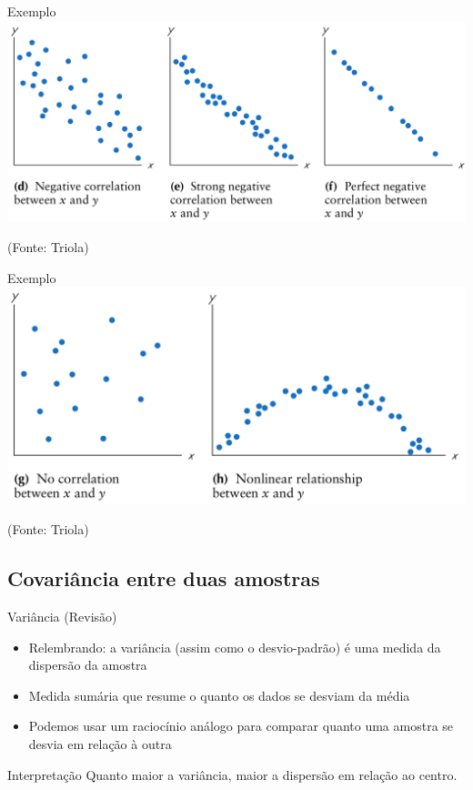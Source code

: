 \documentclass{beamer}
\begin{document}
\begin{frame}{Exemplo}
  \includegraphics[height=0.6\textheight]{Assoc/negative}

  (Fonte: Triola)
\end{frame}

\begin{frame}{Exemplo}
  \includegraphics[height=0.6\textheight]{Assoc/other}

  (Fonte: Triola)
\end{frame}

\subsection[Covariância]{Covariância entre duas amostras}

\begin{frame}{Variância (Revisão)}
  \begin{itemize}
  \item Relembrando: a variância (assim como o desvio-padrão) é uma
    medida da dispersão da amostra
  \item Medida sumária que resume o quanto os dados se desviam da
    média
  \item Podemos usar um raciocínio análogo para comparar quanto uma
    amostra se desvia em relação à outra
  \end{itemize}
  \begin{block}{Interpretação}
    Quanto maior a variância, maior a dispersão em relação ao centro.
  \end{block}
\end{frame}
\end{document}
